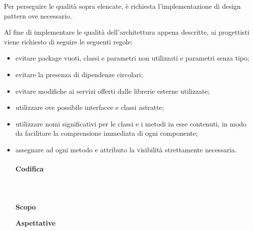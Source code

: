 		Per perseguire le qualità sopra elencate, è richiesta l'implementazione di design pattern
		ove necessario. 
		\newline
		
		Al fine di implementare le qualità dell'architettura appena descritte, 
		ai progettisti viene richiesto di seguire le seguenti regole:
			\begin{itemize}
				\item evitare package vuoti, classi e parametri non utilizzati e parametri senza tipo;
				\item evitare la presenza di dipendenze circolari;
				\item evitare modifiche ai servizi offerti dalle librerie esterne utilizzate;
				\item utilizzare ove possibile interfacce e classi astratte;
				\item utilizzare nomi significativi per le classi e i metodi in esse contenuti, 
					in modo da facilitare la comprensione immediata di ogni componente;
				\item assegnare ad ogni metodo e attributo la visibilità strettamente necessaria.

	
		\paragraph{Codifica}
			\mbox{}\\ \mbox{}\\
			\noindent\textbf{Scopo} \mbox{}\\
	
			 \newline
						
			\noindent\textbf{Aspettative} \mbox{}\\
			
			 \newline 
			

\end{itemize}
